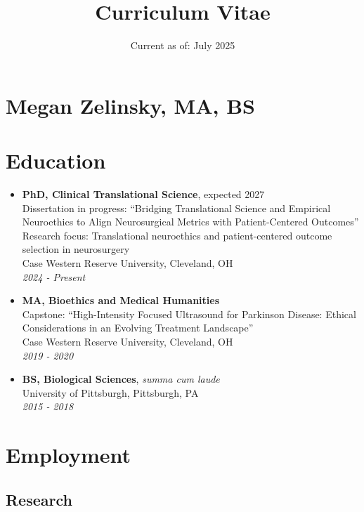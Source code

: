 \documentclass[
  letterpaper,
  DIV=11,
  numbers=noendperiod]{scrartcl}
\title{Curriculum Vitae}
\subtitle{Current as of: July 2025}
\author{}
\date{}
\begin{document}
\maketitle

\section{Megan Zelinsky, MA, BS}\label{megan-zelinsky-ma-bs}

\section{Education}\label{education}

\begin{itemize}
\item
  \textbf{PhD, Clinical Translational Science}, expected 2027\\
  Dissertation in progress: ``Bridging Translational Science and
  Empirical Neuroethics to Align Neurosurgical Metrics with
  Patient-Centered Outcomes''\\
  Research focus: Translational neuroethics and patient-centered outcome
  selection in neurosurgery\\
  Case Western Reserve University, Cleveland, OH\\
  \emph{2024 - Present}
\item
  \textbf{MA, Bioethics and Medical Humanities}\\
  Capstone: ``High-Intensity Focused Ultrasound for Parkinson Disease:
  Ethical Considerations in an Evolving Treatment Landscape''\\
  Case Western Reserve University, Cleveland, OH\\
  \emph{2019 - 2020}
\item
  \textbf{BS, Biological Sciences}, \emph{summa cum laude}\\
  University of Pittsburgh, Pittsburgh, PA\\
  \emph{2015 - 2018}
\end{itemize}

\section{Employment}\label{employment}

\subsection{Research}\label{research}
\end{document}
